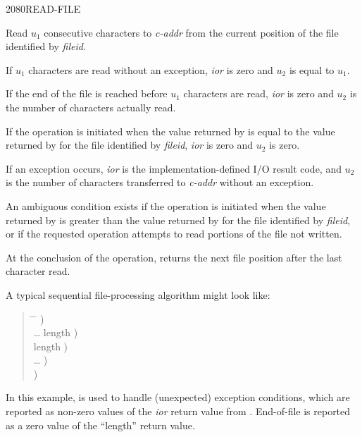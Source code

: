 \begin{newword}{2080}{READ-FILE}

	Read $u_1$ consecutive characters to \emph{c-addr} from the
	current position of the file identified by \emph{fileid}.

	If $u_1$ characters are read without an exception, \emph{ior}
	is zero and $u_2$ is equal to $u_1$.

	If the end of the file is reached before $u_1$ characters are
	read, \emph{ior} is zero and $u_2$ is the number of characters
	actually read.

	If the operation is initiated when the value returned by
	 is equal to the value returned by
	 for the file identified by \emph{fileid},
	\emph{ior} is zero and $u_2$ is zero.

	If an exception occurs, \emph{ior} is the implementation-defined
	I/O result code, and $u_2$ is the number of characters
	transferred to \emph{c-addr} without an exception.

	An ambiguous condition exists if the operation is initiated when
	the value returned by  is greater than the
	value returned by  for the file identified by
	\emph{fileid}, or if the requested operation attempts to read
	portions of the file not written.

	At the conclusion of the operation,  returns
	the next file position after the last character read.

	\begin{rationale} %
		A typical sequential file-processing algorithm might look like:
		\begin{quote}\ttfamily{}
			\begin{tabbing}
			\tab \= \hspace{12em} \= \kill
								\>\>  ) \\ 
			\> {\ldots}  
											\>	  length ) \\
			 		\>\> \word{p} length ) \\
			\> {\ldots}						\>	  ) \\
								\>\>  )
			\end{tabbing}
		\end{quote}

		In this example,  is used to handle
		(unexpected) exception conditions, which are reported as
		non-zero values of the \emph{ior} return value from
		. End-of-file is reported as a zero value of
		the ``length'' return value.
	\end{rationale}
\end{newword}


